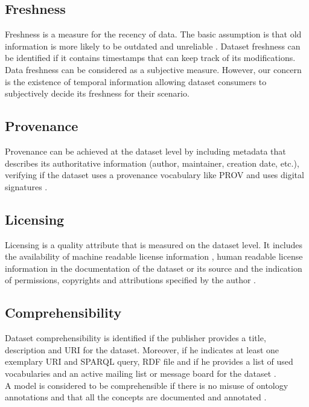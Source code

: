 \documentclass[onecolumn, crcready]{iosart2c}
\begin{document}
\subsection{Freshness}

Freshness is a measure for the recency of data. The basic assumption is that old information is more likely to be outdated and unreliable \cite{Flouris2012}. Dataset freshness can be identified if it contains timestamps that can keep track of its modifications. Data freshness can be considered as a subjective measure. However, our concern is the existence of temporal information allowing dataset consumers to subjectively decide its freshness for their scenario.

\subsection{Provenance}

Provenance can be achieved at the dataset level by including metadata that describes its authoritative information (author, maintainer, creation date, etc.), verifying if the dataset uses a provenance vocabulary like PROV \cite{w3c-prov-o} and uses digital signatures \cite{Framework2012}.\\

\subsection{Licensing}

Licensing is a quality attribute that is measured on the dataset level. It includes the availability of machine readable license information \cite{Hogan:2012:ESL:2263498.2264570}, human readable license information in the documentation of the dataset or its source \cite{Hogan:2012:ESL:2263498.2264570} and the indication of permissions, copyrights and attributions specified by the author \cite{Framework2012}.

\subsection{Comprehensibility}

Dataset comprehensibility is identified if the publisher provides a title, description and URI for the dataset. Moreover, if he indicates at least one exemplary URI and SPARQL query, RDF file and if he provides a list of used vocabularies and an active mailing list or message board for the dataset \cite{flemming2010}.\\ A model is considered to be comprehensible if there is no misuse of ontology annotations and that all the concepts are documented and annotated \cite{Mader2012}\cite{DBLP:conf/ic3k/KeetSP13}.
\end{document}
